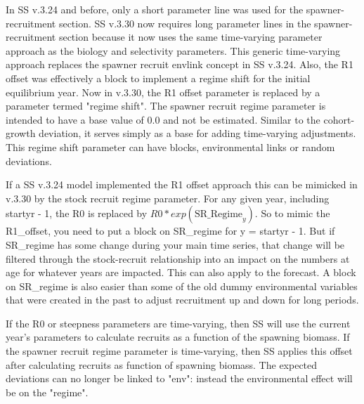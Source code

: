 In SS v.3.24 and before, only a short parameter line was used for the spawner-recruitment section. SS v.3.30 now requires long parameter lines in the spawner-recruitment section because it now uses the same time-varying parameter approach as the biology and selectivity parameters. This generic time-varying approach replaces the spawner recruit envlink concept in SS v.3.24.  Also, the R1 offset was effectively a block to implement a regime shift for the initial equilibrium year.  Now in v.3.30, the R1 offset parameter is replaced by a parameter termed "regime shift". The spawner recruit regime parameter is intended to have a base value of 0.0 and not be estimated.  Similar to the cohort-growth deviation, it serves simply as a base for adding time-varying adjustments. This regime shift parameter can have blocks, environmental links or random deviations. 

If a SS v.3.24 model implemented the R1 offset approach this can be mimicked in v.3.30 by the stock recruit regime parameter. For any given year, including startyr - 1, the R0 is replaced by $R0*exp(\mathrm{SR\_Regime}_y)$. So to mimic the R1\_offset, you need to put a block on SR\_regime for y = startyr - 1. But if SR\_regime has some change during your main time series, that change will be filtered through the stock-recruit relationship into an impact on the numbers at age for whatever years are impacted. This can also apply to the forecast. A block on SR\_regime is also easier than some of the old dummy environmental variables that were created in the past to adjust recruitment up and down for long periods.

If the R0 or steepness parameters are time-varying, then SS will use the current year's parameters to calculate recruits as a function of the spawning biomass. If the spawner recruit regime parameter is time-varying, then SS applies this offset after calculating recruits as function of spawning biomass.  The expected deviations can no longer be linked to "env": instead the environmental effect will be on the "regime". 

